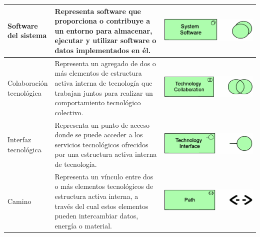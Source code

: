 \begin{longtable}{|p{0.15\linewidth}|p{0.45\linewidth}|p{0.4\linewidth} |}
    Software del sistema 
    &
    Representa software que proporciona o 
    contribuye a un entorno para almacenar, 
    ejecutar y utilizar software o datos 
    implementados en él.
    &
\begin{center}
    \includegraphics[width=0.8\linewidth]{imgs/capa_tecnologia/System software.pdf}
\end{center} 
    \\ \hline



    Colaboración tecnológica
    &
    Representa un agregado de dos o más elementos 
        de estructura activa interna de tecnología que 
        trabajan juntos para realizar un 
        comportamiento tecnológico colectivo.
    &
\begin{center}
    \includegraphics[width=0.8\linewidth]{imgs/capa_tecnologia/Technology collaboration.pdf}
\end{center} 
    \\ \hline

    Interfaz tecnológica
    &
    Representa un punto de acceso donde se puede 
    acceder a los servicios tecnológicos ofrecidos por 
    una estructura activa interna de tecnología.
    &
\begin{center}
    \includegraphics[width=0.8\linewidth]{imgs/capa_tecnologia/Technology interface.pdf}
\end{center} 
    \\ \hline

    Camino
    &
    Representa un vínculo entre dos o más 
        elementos tecnológicos de estructura activa 
        interna, a través del cual estos elementos 
        pueden intercambiar datos, energía o material.
    &
\begin{center}
    \includegraphics[width=0.8\linewidth]{imgs/capa_tecnologia/Path.pdf}
\end{center} 
    \\ \hline


\end{longtable}
